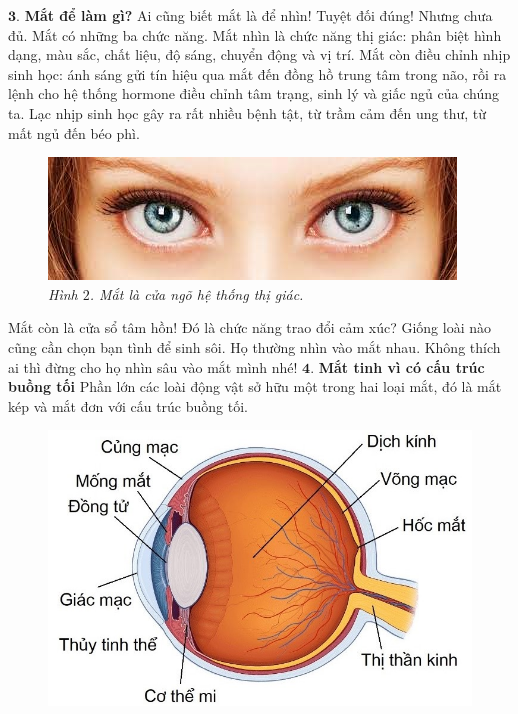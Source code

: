 \begin{multicols}{2}
	\vskip 0.1cm
	$\pmb{3.}$	\textbf{\color{timhieukhoahoc}Mắt để làm gì?}
	\vskip 0.1cm
	Ai cũng biết mắt là để nhìn! Tuyệt đối đúng! Nhưng chưa đủ. Mắt có những ba chức năng.  
	\vskip 0.1cm
	Mắt nhìn là chức năng thị giác: phân biệt hình dạng, màu sắc, chất liệu, độ sáng, chuyển động và vị trí. Mắt còn điều chỉnh nhịp sinh học: ánh sáng gửi tín hiệu qua mắt đến đồng hồ trung tâm trong não, rồi ra lệnh cho hệ thống hormone điều chỉnh tâm trạng, sinh lý và giấc ngủ của chúng ta. Lạc nhịp sinh học gây ra rất nhiều bệnh tật, từ trầm cảm đến ung thư, từ mất ngủ đến béo phì. 
	\begin{figure}[H]
		\vspace*{-5pt}
		\centering
		\captionsetup{labelformat= empty, justification=centering}
		\includegraphics[width= 1\linewidth]{2}
		\caption{\small\textit{\color{timhieukhoahoc}Hình $2$. Mắt là cửa ngõ hệ thống thị giác.}}
		\vspace*{-10pt}
	\end{figure}
	Mắt còn là cửa sổ tâm hồn! Đó là chức năng trao đổi cảm xúc? Giống loài nào cũng cần chọn bạn tình để sinh sôi. Họ thường nhìn vào mắt nhau. Không thích ai thì đừng cho họ nhìn sâu vào mắt mình nhé!
	\vskip 0.1cm
	$\pmb{4.}$ \textbf{\color{timhieukhoahoc}Mắt tinh vì có cấu trúc buồng tối}
	\vskip 0.1cm
	Phần lớn các loài động vật sở hữu một trong hai loại mắt, đó là mắt kép và mắt đơn với cấu trúc buồng tối. 
	\begin{figure}[H]
		\vspace*{-5pt}
		\centering
		\captionsetup{labelformat= empty, justification=centering}
		\includegraphics[width= 0.8\linewidth]{3}

\end{figure}
\end{multicols}
